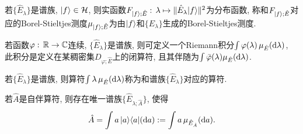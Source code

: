 \begin{definition}
    若$\{\hat{E}_\lambda\}$是谱族, $|f\rangle\in\mathcal{H}$, 则实函数$F_{|f\rangle;\hat{E}}:\,\lambda\mapsto\lVert\hat{E}_\lambda|f\rangle\rVert^2$为分布函数, 称和$F_{|f\rangle;\hat{E}}$对应的Borel-Stieltjes测度$\mu_{|f\rangle;\hat{E}}$为由$|f\rangle$和$\{\hat{E}_\lambda\}$生成的Borel-Stieltjes测度.
\end{definition}

\begin{theorem}
    若函数$\varphi:\,\mathbb{R}\to\mathbb{C}$连续, $\{\hat{E}_\lambda\}$是谱族, 则可定义一个Riemann积分$\int\varphi(\lambda)\,\mu_{\hat{E}}(\mathrm{d}\lambda)$, 此积分是定义在某稠密集$D_{\varphi;\hat{E}}$上的闭算符, 且其伴随为$\int\bar{\varphi}(\lambda)\mu_{\hat{E}}(\mathrm{d}\lambda)$.
\end{theorem}

\begin{definition}
    若$\{\hat{E}_\lambda\}$是谱族, 则算符$\int\lambda\,\mu_{\hat{E}}(\mathrm{d}\lambda)$称为和谱族$\{\hat{E}_\lambda\}$对应的算符.
\end{definition}

\begin{theorem}
    若$\hat{A}$是自伴算符, 则存在唯一谱族$\{\hat{E}_{\lambda;\hat{A}}\}$, 使得\begin{equation*}
        \hat{A}=\int a\,|a\rangle\langle a|(\mathrm{d} a):=\int a\,\mu_{\hat{E}_{\hat{A}}}(\mathrm{d} a).
    \end{equation*}
\end{theorem}
